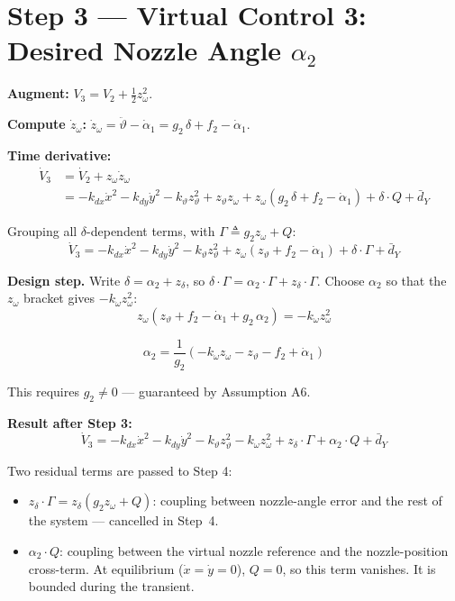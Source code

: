 \documentclass[11pt,a4paper]{article}
\theoremstyle{plain}
\theoremstyle{remark}
\newcommand{\vth}{\vartheta}
\newcommand{\zth}{z_{\vth}}
\newcommand{\zom}{z_{\omega}}
\newcommand{\zdel}{z_{\delta}}
\begin{document}
\section{Step 3 --- Virtual Control 3: Desired Nozzle Angle \texorpdfstring{$\alpha_2$}{alpha2}}

\textbf{Augment:} $V_3 = V_2 + \tfrac{1}{2}\zom^2$.

\textbf{Compute $\dot\zom$:} $\dot\zom = \ddot\vth - \dot\alpha_1 = g_2\,\delta + f_2 - \dot\alpha_1$.

\textbf{Time derivative:}
\begin{align*}
  \dot V_3 &= \dot V_2 + \zom\dot\zom \\
  &= -k_{dx}\dot x^2 - k_{dy}\dot y^2 - k_\vth \zth^2 + \zth\zom + \zom(g_2\,\delta + f_2 - \dot\alpha_1) + \delta\cdot Q + \bar{d}_Y
\end{align*}

Grouping all $\delta$-dependent terms, with $\Gamma \triangleq g_2\zom + Q$:
\begin{equation}
  \dot V_3 = -k_{dx}\dot x^2 - k_{dy}\dot y^2 - k_\vth \zth^2 + \zom(\zth + f_2 - \dot\alpha_1) + \delta\cdot\Gamma + \bar{d}_Y
  \tag{DV3}
\end{equation}

\textbf{Design step.} Write $\delta = \alpha_2 + \zdel$, so $\delta\cdot\Gamma = \alpha_2\cdot\Gamma + \zdel\cdot\Gamma$. Choose $\alpha_2$ so that the $\zom$ bracket gives $-k_\omega\zom^2$:
\[
  \zom(\zth + f_2 - \dot\alpha_1 + g_2\,\alpha_2) = -k_\omega\zom^2
\]

\begin{equation}
  \boxed{\alpha_2 = \frac{1}{g_2}\!\left(-k_\omega \zom - \zth - f_2 + \dot\alpha_1\right)}
  \tag{VC2}
\end{equation}

This requires $g_2 \neq 0$ --- guaranteed by Assumption A6.

\textbf{Result after Step 3:}
\begin{equation}
  \dot V_3 = -k_{dx}\dot x^2 - k_{dy}\dot y^2 - k_\vth \zth^2 - k_\omega\zom^2 + \zdel\cdot\Gamma + \alpha_2\cdot Q + \bar{d}_Y
  \tag{DV3'}
\end{equation}

Two residual terms are passed to Step 4:
\begin{itemize}
  \item $\zdel\cdot\Gamma = \zdel(g_2\zom + Q)$: coupling between nozzle-angle error and the rest of the system --- cancelled in Step~4.
  \item $\alpha_2\cdot Q$: coupling between the virtual nozzle reference and the nozzle-position cross-term. At equilibrium ($\dot x = \dot y = 0$), $Q = 0$, so this term vanishes. It is bounded during the transient.
\end{itemize}
\end{document}
